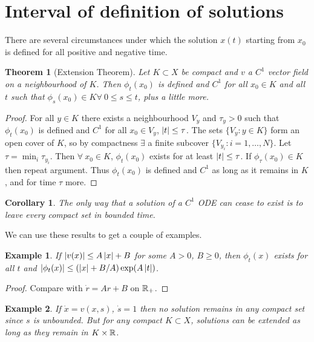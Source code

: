 \documentclass{notes}
\theoremstyle{plain}
\newtheorem*{theorem}{Theorem}
\newtheorem*{corollary}{Corollary}
\newtheorem*{example}{Example}
\begin{document}
\section{Interval of definition of solutions}

There are several circumstances under which the solution $x(t)$
starting from $x_0$ is defined for all positive and negative time.

\begin{theorem}[Extension Theorem]
  Let $K \subset X$ be compact and $v$ a $C^1$ vector field on a
  neighbourhood of $K$.  Then $\phi_t (x_0)$ is defined and $C^1$ for
  all $x_0 \in K$ and all $t$ such that $\phi_s(x_0) \in K \forall\ 0
  \le s \le t$, plus a little more.
\end{theorem}

\begin{proof}
  For all $y \in K$ there exists a neighbourhood $V_y$ and $\tau_y >
  0$ such that $\phi_t (x_0)$ is defined and $C^1$ for all $x_0 \in
  V_y$, $\left|t\right| \le \tau$.  The sets $\{ V_y : y \in K \}$ form an
  open cover of $K$, so by compactness $\exists$ a finite subcover
  $\{V_{y_i} : i = 1, \dots, N \}$.  Let $\tau = \min_i \tau_{y_i}$.
  Then $\forall\ x_0 \in K$, $\phi_t(x_0)$ exists for at least
  $\left|t\right| \le \tau$.  If $\phi_\tau(x_0) \in K$ then repeat argument.
  Thus $\phi_t(x_0)$ is defined and $C^1$ as long as it remains in
  $K$, and for time $\tau$ more.
\end{proof}

\begin{corollary}
  The only way that a solution of a $C^1$ ODE can cease to exist is to
  leave every compact set in bounded time.
\end{corollary}

We can use these results to get a couple of examples.

\begin{example}
  If $\left|v(x)\right| \le A \left|x\right| + B$ for some $A > 0$, $B \ge 0$, then
  $\phi_t(x)$ exists for all $t$ and $\left|\phi_t(x)\right| \le (\left|x\right| +
  B/A) \exp(A \left|t\right|)$.
\end{example}

\begin{proof}
  Compare with $\dot{r} = A r + B$ on $\mathbb{R}_+$.
\end{proof}

\begin{example}
  If $\dot{x} = v(x,s)$, $\dot{s} = 1$ then no solution remains in any
  compact set since $s$ is unbounded.  But for any compact $K \subset
  X$, solutions can be extended as long as they remain in $K \times
  \mathbb{R}$.
\end{example}
\end{document}
